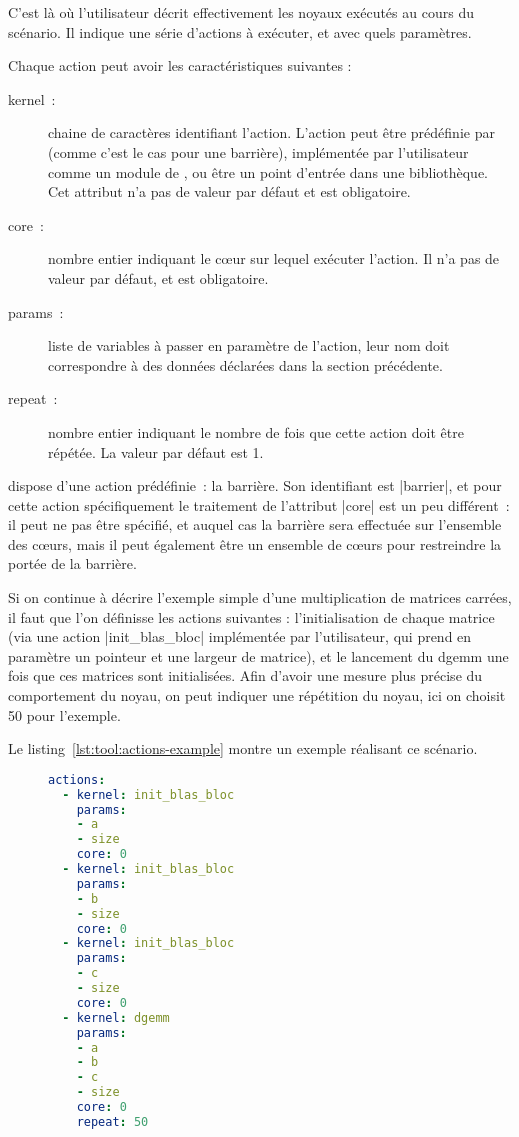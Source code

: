 C'est là où l'utilisateur décrit effectivement les noyaux exécutés au cours du scénario.
Il indique une série d'actions à exécuter, et avec quels paramètres.

Chaque action peut avoir les caractéristiques suivantes :
\begin{description}
  \item [kernel~:] chaine de caractères identifiant l'action. L'action peut être prédéfinie par \outil (comme c'est le cas pour une barrière), implémentée par l'utilisateur comme un module de \outil, ou être un point d'entrée dans une bibliothèque.
    Cet attribut n'a pas de valeur par défaut et est obligatoire.
  \item [core~:] nombre entier indiquant le cœur sur lequel exécuter l'action. Il n'a pas de valeur par défaut, et est obligatoire.
  \item [params~:] liste de variables à passer en paramètre de l'action, leur nom doit correspondre à des données déclarées dans la section précédente.
  \item [repeat~:] nombre entier indiquant le nombre de fois que cette action doit être répétée. La valeur par défaut est 1.
\end{description}

\outil dispose d'une action prédéfinie~: la barrière. Son identifiant est |barrier|, et pour cette action spécifiquement le traitement de l'attribut |core| est un peu différent~: il peut ne pas être spécifié, et auquel cas la barrière sera effectuée sur l'ensemble des cœurs, mais il peut également être un ensemble de cœurs pour restreindre la portée de la barrière.


Si on continue à décrire l'exemple simple d'une multiplication de matrices carrées, il faut que l'on définisse les actions suivantes : l'initialisation de chaque matrice (via une action |init_blas_bloc| implémentée par l'utilisateur, qui prend en paramètre un pointeur et une largeur de matrice), et le lancement du dgemm une fois que ces matrices sont initialisées.
Afin d'avoir une mesure plus précise du comportement du noyau, on peut indiquer une répétition du noyau, ici on choisit 50 pour l'exemple.

Le listing~\ref{lst:tool:actions-example} montre un exemple réalisant ce scénario.

\begin{figure}[h!]
\begin{lstlisting}[language=yaml,caption=Exemple de déclaration d'actions,label=lst:tool:actions-example]
actions:
  - kernel: init_blas_bloc
    params:
    - a
    - size
    core: 0
  - kernel: init_blas_bloc
    params:
    - b
    - size
    core: 0
  - kernel: init_blas_bloc
    params:
    - c
    - size
    core: 0
  - kernel: dgemm
    params:
    - a
    - b
    - c
    - size
    core: 0
    repeat: 50
\end{lstlisting}
\end{figure}

